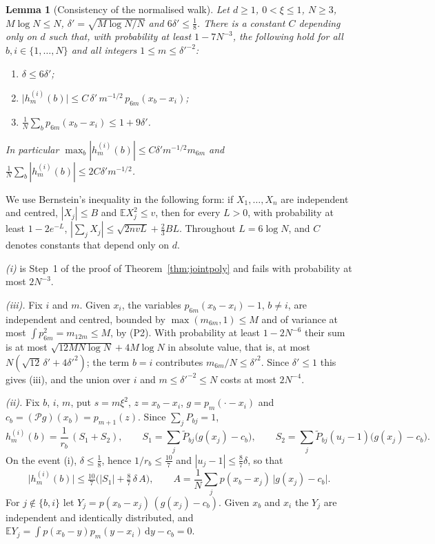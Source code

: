 \documentclass[11pt,a4paper]{article}
\makeatletter
\theoremstyle{stmt}
\newtheorem{lemma}[theorem]{Lemma}
\theoremstyle{defn}
\theoremstyle{rmk}
\renewenvironment{proof}[1][\proofname]{\par\pushQED{\qed}\normalfont\topsep6\p@\@plus6\p@\relax
  \trivlist\item[\hskip\labelsep{\sffamily\itshape\small #1.}]\ignorespaces}{\popQED\endtrivlist\@endpefalse}
\numberwithin{equation}{section}
\newcommand{\dd}{\mathrm{d}}
\makeatother
\begin{document}
{\begin{lemma}[Consistency of the normalised walk]\label{lem:consistency}
Let $d\ge1$, $0<\xi\le1$, $N\ge3$, $M\log N\le N$, $\delta'=\sqrt{M\log N/N}$ and $6\delta'\le\frac18$. There is a constant $C$ depending only on $d$ such that, with probability at least $1-7N^{-3}$, the following hold for all $b,i\in\{1,\dots,N\}$ and all integers $1\le m\le\delta'^{-2}$:
\begin{enumerate}[label=\textup{(\roman*)}]
\item $\delta\le6\delta'$;
\item $\big|h^{(i)}_m(b)\big|\le C\,\delta'\,m^{-1/2}\,p_{6m}(x_b-x_i)$;
\item $\frac1N\sum_bp_{6m}(x_b-x_i)\le1+9\delta'$.
\end{enumerate}
In particular $\max_b|h^{(i)}_m(b)|\le C\delta'm^{-1/2}m_{6m}$ and $\frac1N\sum_b|h^{(i)}_m(b)|\le2C\delta'm^{-1/2}$.
\end{lemma}

\begin{proof}
We use Bernstein's inequality in the following form: if $X_1,\dots,X_n$ are independent and centred, $|X_j|\le B$ and $\mathbb EX_j^2\le v$, then for every $L>0$, with probability at least $1-2e^{-L}$, $|\sum_jX_j|\le\sqrt{2nvL}+\frac23BL$. Throughout $L=6\log N$, and $C$ denotes constants that depend only on $d$.

\emph{\textup{(i)}} is Step~1 of the proof of Theorem~\ref{thm:jointpoly} and fails with probability at most $2N^{-3}$.

\emph{\textup{(iii)}.} Fix $i$ and $m$. Given $x_i$, the variables $p_{6m}(x_b-x_i)-1$, $b\ne i$, are independent and centred, bounded by $\max(m_{6m},1)\le M$ and of variance at most $\int p_{6m}^2=m_{12m}\le M$, by (P2). With probability at least $1-2N^{-6}$ their sum is at most $\sqrt{12MN\log N}+4M\log N$ in absolute value, that is, at most $N(\sqrt{12}\,\delta'+4\delta'^2)$; the term $b=i$ contributes $m_{6m}/N\le\delta'^2$. Since $\delta'\le1$ this gives (iii), and the union over $i$ and $m\le\delta'^{-2}\le N$ costs at most $2N^{-4}$.

\emph{\textup{(ii)}.} Fix $b$, $i$, $m$, put $s=m\xi^2$, $z=x_b-x_i$, $g=p_m(\cdot-x_i)$ and $c_b=(\mathcal Pg)(x_b)=p_{m+1}(z)$. Since $\sum_jP_{bj}=1$,
\begin{equation}\label{eq:cons-split}
h^{(i)}_m(b)=\frac1{r_b}\,(S_1+S_2),\qquad S_1=\sum_j\tilde P_{bj}\big(g(x_j)-c_b\big),\qquad S_2=\sum_j\tilde P_{bj}(u_j-1)\big(g(x_j)-c_b\big).
\end{equation}
On the event (i), $\delta\le\frac18$, hence $1/r_b\le\frac{10}7$ and $|u_j-1|\le\frac87\delta$, so that
\[
\big|h^{(i)}_m(b)\big|\le\tfrac{10}7\big(|S_1|+\tfrac87\,\delta\,A\big),\qquad A=\frac1N\sum_jp(x_b-x_j)\,\big|g(x_j)-c_b\big| .
\]
For $j\notin\{b,i\}$ let $Y_j=p(x_b-x_j)\,(g(x_j)-c_b)$. Given $x_b$ and $x_i$ the $Y_j$ are independent and identically distributed, and $\mathbb EY_j=\int p(x_b-y)p_m(y-x_i)\,\dd y-c_b=0$.


\end{proof}}
\end{document}
